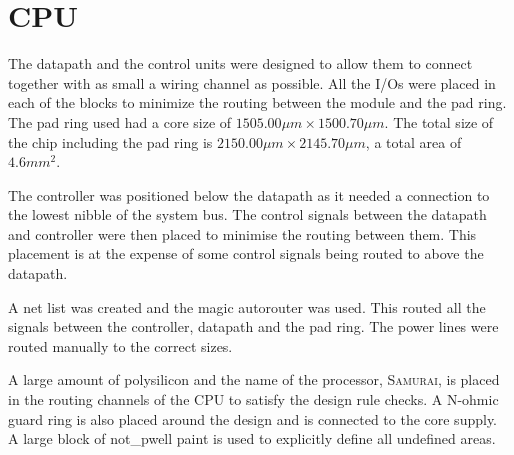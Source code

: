 

\section{CPU}


The datapath and the control units were designed to allow them to connect together with as small a wiring channel as possible. 
All the I/Os were placed in each of the blocks to minimize the routing between the module and the pad ring. 
The pad ring used had a core size of $1505.00\mu m \times 1500.70\mu m$. 
The total size of the chip including the pad ring is $ 2150.00\mu m \times 2145.70\mu m$, a total area of $4.6mm^2$.

The controller was positioned below the datapath as it needed a connection to the lowest nibble of the system bus. 
The control signals between the datapath and controller were then placed to minimise the routing between them. 
This placement is at the expense of some control signals being routed to above the datapath. 

A net list was created and the magic autorouter was used.
This routed all the signals between the controller, datapath and the pad ring. 
The power lines were routed manually to the correct sizes. 

A large amount of polysilicon and the name of the processor, \textsc{Samurai}, is placed in the routing channels of the CPU to satisfy the design rule checks. 
A N-ohmic guard ring is also placed around the design and is connected to the core supply.
A large block of not\_pwell paint is used to explicitly define all undefined areas. 


